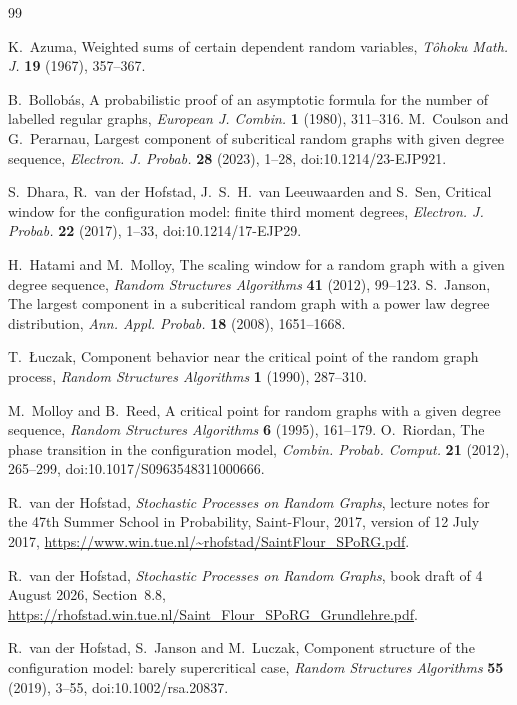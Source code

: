 \documentclass[11pt]{amsart}
\theoremstyle{definition}
\theoremstyle{remark}
\numberwithin{equation}{section}
\begin{document}
\begin{thebibliography}{99}

 K.~Azuma, Weighted sums of certain dependent random variables, \emph{T\^ohoku Math. J.} \textbf{19} (1967), 357--367.

 B.~Bollob\'as, A probabilistic proof of an asymptotic formula for the number of labelled regular graphs, \emph{European J. Combin.} \textbf{1} (1980), 311--316.
 M.~Coulson and G.~Perarnau, Largest component of subcritical random graphs with given degree sequence, \emph{Electron. J. Probab.} \textbf{28} (2023), 1--28, doi:10.1214/23-EJP921.

 S.~Dhara, R.~van der Hofstad, J.~S.~H.~van Leeuwaarden and S.~Sen, Critical window for the configuration model: finite third moment degrees, \emph{Electron. J. Probab.} \textbf{22} (2017), 1--33, doi:10.1214/17-EJP29.

 H.~Hatami and M.~Molloy, The scaling window for a random graph with a given degree sequence, \emph{Random Structures Algorithms} \textbf{41} (2012), 99--123.
 S.~Janson, The largest component in a subcritical random graph with a power law degree distribution, \emph{Ann. Appl. Probab.} \textbf{18} (2008), 1651--1668.

 T.~{\L}uczak, Component behavior near the critical point of the random graph process, \emph{Random Structures Algorithms} \textbf{1} (1990), 287--310.

 M.~Molloy and B.~Reed, A critical point for random graphs with a given degree sequence, \emph{Random Structures Algorithms} \textbf{6} (1995), 161--179.
 O.~Riordan, The phase transition in the configuration model, \emph{Combin. Probab. Comput.} \textbf{21} (2012), 265--299, doi:10.1017/S0963548311000666.

 R.~van der Hofstad, \emph{Stochastic Processes on Random Graphs}, lecture notes for the 47th Summer School in Probability, Saint-Flour, 2017, version of 12 July 2017, \url{https://www.win.tue.nl/~rhofstad/SaintFlour_SPoRG.pdf}.

 R.~van der Hofstad, \emph{Stochastic Processes on Random Graphs}, book draft of 4 August 2026, Section~8.8, \url{https://rhofstad.win.tue.nl/Saint_Flour_SPoRG_Grundlehre.pdf}.

 R.~van der Hofstad, S.~Janson and M.~Luczak, Component structure of the configuration model: barely supercritical case, \emph{Random Structures Algorithms} \textbf{55} (2019), 3--55, doi:10.1002/rsa.20837.


\end{thebibliography}
\end{document}
